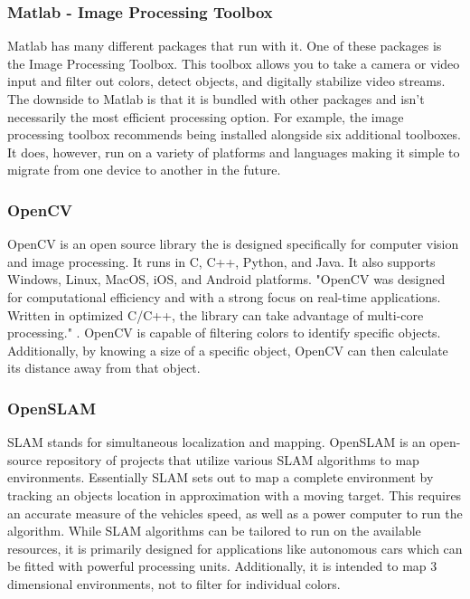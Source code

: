 \documentclass[onecolumn, draftclsnofoot,10pt, compsoc]{IEEEtran}
\begin{document}
\subsubsection{Matlab - Image Processing Toolbox}

Matlab has many different packages that run with it. One of these 
packages is the Image Processing Toolbox\cite{r9}. This toolbox allows you to take a camera or video input and filter out colors, detect 
objects, and digitally stabilize video streams. The downside to 
Matlab is that it is bundled with other packages and isn't 
necessarily the most efficient processing option. For example, the 
image processing toolbox recommends being installed alongside six 
additional toolboxes. It does, however, run on a variety of 
platforms and languages making it simple to migrate from one device 
to another in the future. 


\subsubsection{OpenCV}

OpenCV is an open source library the is designed specifically for 
computer vision and image processing. It runs in C, C++, Python, 
and Java. It also supports Windows, Linux, MacOS, iOS, and Android 
platforms. "OpenCV was designed for computational efficiency and 
with a strong focus on real-time applications. Written in optimized 
C/C++, the library can take advantage of multi-core processing." \cite{r8}.
OpenCV is capable of filtering colors to identify specific objects. 
Additionally, by knowing a size of a specific object, OpenCV can 
then calculate its distance away from that object. 


\subsubsection{OpenSLAM}

SLAM stands for simultaneous localization and mapping. 
OpenSLAM\cite{r10} is an open-source repository of projects that 
utilize various SLAM algorithms to map environments. Essentially 
SLAM sets out to map a complete environment by tracking an objects 
location in approximation with a moving target. This requires an 
accurate measure of the vehicles speed, as well as a power computer 
to run the algorithm. While SLAM algorithms can be tailored to run 
on the available resources, it is primarily designed for 
applications like autonomous cars which can be fitted with powerful 
processing units. Additionally, it is intended to map 3 dimensional 
environments, not to filter for individual colors.
\end{document}
